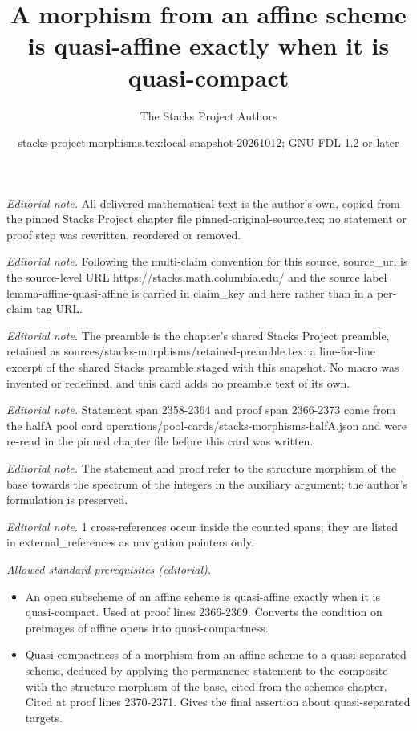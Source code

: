 \documentclass[10pt,a4paper]{amsart}
\title{A morphism from an affine scheme is quasi-affine exactly when it is quasi-compact}
\author{The Stacks Project Authors}
\date{stacks-project:morphisms.tex:local-snapshot-20261012; GNU FDL 1.2 or later}
\theoremstyle{plain}
\theoremstyle{definition}
\theoremstyle{remark}
\numberwithin{equation}{subsection}
\begin{document}
\maketitle
\noindent\textit{Editorial note.} All delivered mathematical text is the author's own, copied from the pinned Stacks Project chapter file pinned-original-source.tex; no statement or proof step was rewritten, reordered or removed.\par\medskip
\noindent\textit{Editorial note.} Following the multi-claim convention for this source, source\_url is the source-level URL https://stacks.math.columbia.edu/ and the source label lemma-affine-quasi-affine is carried in claim\_key and here rather than in a per-claim tag URL.\par\medskip
\noindent\textit{Editorial note.} The preamble is the chapter's shared Stacks Project preamble, retained as sources/stacks-morphisms/retained-preamble.tex: a line-for-line excerpt of the shared Stacks preamble staged with this snapshot. No macro was invented or redefined, and this card adds no preamble text of its own.\par\medskip
\noindent\textit{Editorial note.} Statement span 2358-2364 and proof span 2366-2373 come from the halfA pool card operations/pool-cards/stacks-morphisms-halfA.json and were re-read in the pinned chapter file before this card was written.\par\medskip
\noindent\textit{Editorial note.} The statement and proof refer to the structure morphism of the base towards the spectrum of the integers in the auxiliary argument; the author's formulation is preserved.\par\medskip
\noindent\textit{Editorial note.} 1 cross-references occur inside the counted spans; they are listed in external\_references as navigation pointers only.\par\medskip
\noindent\textit{Allowed standard prerequisites (editorial).}\begin{itemize}
\item An open subscheme of an affine scheme is quasi-affine exactly when it is quasi-compact. Used at proof lines 2366-2369. Converts the condition on preimages of affine opens into quasi-compactness.
\item Quasi-compactness of a morphism from an affine scheme to a quasi-separated scheme, deduced by applying the permanence statement to the composite with the structure morphism of the base, cited from the schemes chapter. Cited at proof lines 2370-2371. Gives the final assertion about quasi-separated targets.
\end{itemize}\medskip
\end{document}
